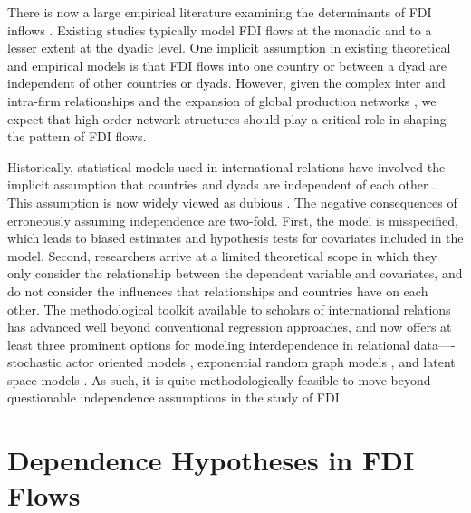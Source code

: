 \documentclass[12pt]{article}
\begin{document}
There is now a large empirical literature examining the determinants of FDI inflows \citep[e.g.,][]{Noorbakhsh_et_al:2001,Yeaple:2003,Jensen:2003,Li_Resnick:2003,Buthe_Milner:2008,Li_Vashchilko:2010,Kerner:2009}. Existing studies typically model FDI flows at the monadic and to a lesser extent at the dyadic level. One implicit assumption in existing theoretical and empirical models is that FDI flows into one country or between a dyad are independent of other countries or dyads. However, given the complex inter and intra-firm relationships and the expansion of global production networks \citep{UNCTAD:2013}, we expect that high-order network structures should play a critical role in shaping the pattern of FDI flows.

Historically, statistical models used in international relations have involved the implicit assumption that countries and dyads are independent of each other \citep{diehl2016conditional,ward2007persistent}. This assumption is now widely viewed as dubious \citep[see, e.g., ][]{ward2007persistent, chu2010homogenization,cranmer2016critique,dorff2013networks,lee2013network,howell2013geography,kinne2016agreeing}. The negative consequences of erroneously assuming independence are two-fold. First, the model is misspecified, which leads to biased estimates and hypothesis tests for covariates included in the model. Second, researchers arrive at a limited theoretical scope in which they only consider the relationship between the dependent variable and covariates, and do not consider the influences that relationships and countries have on each other. The methodological toolkit available to scholars of international relations has advanced well beyond conventional regression approaches, and now offers at least three prominent options for modeling interdependence in relational data----stochastic actor oriented models \citep[e.g., ][]{camber2010geometry,kinne2016agreeing,kinne2013network,kinne2014dependent,warren2016modeling}, exponential random graph models \citep[e.g.,][]{cranmer2012complex,cranmer2012toward,raeymaeckers2016influence}, and latent space models \citep[e.g., ][]{ward2007disputes,ward2013gravity,metternich2013antigovernment}. As such, it is quite methodologically feasible to move beyond questionable independence assumptions in the study of FDI.


\section{Dependence Hypotheses in FDI Flows}
\end{document}
